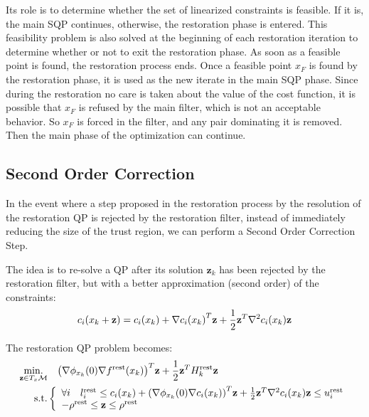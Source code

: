 Its role is to determine whether the set of linearized constraints is feasible.
If it is, the main SQP continues, otherwise, the restoration phase is entered.
This feasibility problem is also solved at the beginning of each restoration iteration to determine whether or not to exit the restoration phase.
As soon as a feasible point is found, the restoration process ends.
Once a feasible point $x_F$ is found by the restoration phase, it is used as the new iterate in the main SQP phase.
Since during the restoration no care is taken about the value of the cost function, it is possible that $x_F$ is refused by the main filter, which is not an acceptable behavior.
So $x_F$ is forced in the filter, and any pair dominating it is removed.
Then the main phase of the optimization can continue.

\subsection{Second Order Correction}
\label{sub:second_order_correction}

In the event where a step proposed in the restoration process by the resolution of the restoration QP is rejected by the restoration filter, instead of immediately reducing the size of the trust region, we can perform a Second Order Correction Step.

The idea is to re-solve a QP after its solution $\mathbf{z}_k$ has been rejected by the restoration filter, but with a better approximation (second order) of the constraints:
\begin{equation}
  c_i(x_k+{\bf z}) = c_i(x_k) + {\nabla c_i(x_k)}^T {\bf z} + \frac{1}{2}{\bf z}^T{\nabla}^2c_i(x_k){\bf z}
\end{equation}

The restoration QP problem becomes:
\begin{align}
  \label{eq:QP_soc_dirty}
  \begin{split}
  \operatorname*{min.}_{\mathbf{z} \in T_x\mathcal{M} } & \quad {\left(\nabla\phi_{x_k}(0) \nabla f^\text{rest} (x_k)\right)}^T\mathbf{z} + \frac{1}{2} {\bf z }^T H^\text{rest}_k{\bf z }\\
  \text{s.t.}&\left\{
  \begin{array}{lr}
    \forall i \quad l^\text{rest}_i \leq c_i(x_k) + {\left(\nabla\phi_{x_k}(0) \nabla c_i (x_k)\right)}^T\mathbf{z} + \frac{1}{2}{\bf z}^T{\nabla}^2c_i(x_k){\bf z}
 \leq u^\text{rest}_i \\
    -\rho^\text{rest} \leq \mathbf{z} \leq \rho^\text{rest} \\
  \end{array}\right.
  \end{split}
\end{align}

